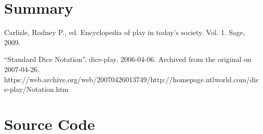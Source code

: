 \documentclass[twocolumn,letterpaper]{article}  %
\begin{document}
\section{Summary}



%
\begin{thebibliography}{1}

Carlisle, Rodney P., ed. Encyclopedia of play in today's society. Vol. 1. Sage, 2009.

``Standard Dice Notation''. dice-play. 2006-04-06. Archived from the original on 2007-04-26. https://web.archive.org/web/20070426013749/http://homepage.ntlworld.com/dice-play/Notation.htm

\end{thebibliography}

\clearpage
\onecolumn
\appendix{}               %

\section{Source Code}        %



\end{document}
